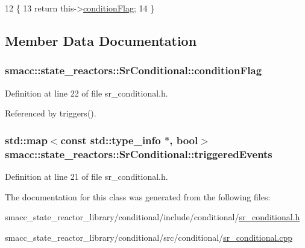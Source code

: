 \begin{DoxyCode}
12 \{
13     \textcolor{keywordflow}{return} this->\hyperlink{classsmacc_1_1state__reactors_1_1SrConditional_a3642c78c02f02ed8eb0e5a41240f445c}{conditionFlag};
14 \}
\end{DoxyCode}


\subsection{Member Data Documentation}
\subsubsection[{\texorpdfstring{condition\+Flag}{conditionFlag}}]{ smacc\+::state\+\_\+reactors\+::\+Sr\+Conditional\+::condition\+Flag\hspace{0.3cm}{\ttfamily [private]}}\hypertarget{classsmacc_1_1state__reactors_1_1SrConditional_a3642c78c02f02ed8eb0e5a41240f445c}{}\label{classsmacc_1_1state__reactors_1_1SrConditional_a3642c78c02f02ed8eb0e5a41240f445c}


Definition at line 22 of file sr\+\_\+conditional.\+h.



Referenced by triggers().

\subsubsection[{\texorpdfstring{triggered\+Events}{triggeredEvents}}]{\setlength{\rightskip}{0pt plus 5cm}std\+::map$<$const std\+::type\+\_\+info $\ast$, {\bf bool}$>$ smacc\+::state\+\_\+reactors\+::\+Sr\+Conditional\+::triggered\+Events\hspace{0.3cm}{\ttfamily [private]}}\hypertarget{classsmacc_1_1state__reactors_1_1SrConditional_a6d841c624d6f6875db2ab6c6314bc3e1}{}\label{classsmacc_1_1state__reactors_1_1SrConditional_a6d841c624d6f6875db2ab6c6314bc3e1}


Definition at line 21 of file sr\+\_\+conditional.\+h.



The documentation for this class was generated from the following files\+:\begin{DoxyCompactItemize}
\item 
smacc\+\_\+state\+\_\+reactor\+\_\+library/conditional/include/conditional/\hyperlink{sr__conditional_8h}{sr\+\_\+conditional.\+h}\item 
smacc\+\_\+state\+\_\+reactor\+\_\+library/conditional/src/conditional/\hyperlink{sr__conditional_8cpp}{sr\+\_\+conditional.\+cpp}\end{DoxyCompactItemize}
